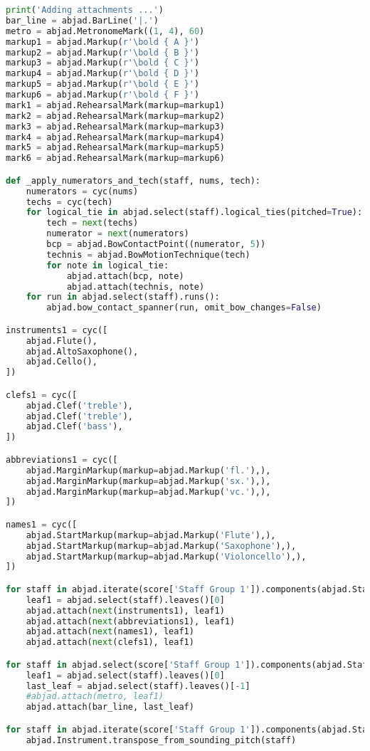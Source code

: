 \begin{lstlisting}[language=Python, caption=Four Ages of Sand Segment\_IV]
print('Adding attachments ...')
bar_line = abjad.BarLine('|.')
metro = abjad.MetronomeMark((1, 4), 60)
markup1 = abjad.Markup(r'\bold { A }')
markup2 = abjad.Markup(r'\bold { B }')
markup3 = abjad.Markup(r'\bold { C }')
markup4 = abjad.Markup(r'\bold { D }')
markup5 = abjad.Markup(r'\bold { E }')
markup6 = abjad.Markup(r'\bold { F }')
mark1 = abjad.RehearsalMark(markup=markup1)
mark2 = abjad.RehearsalMark(markup=markup2)
mark3 = abjad.RehearsalMark(markup=markup3)
mark4 = abjad.RehearsalMark(markup=markup4)
mark5 = abjad.RehearsalMark(markup=markup5)
mark6 = abjad.RehearsalMark(markup=markup6)

def _apply_numerators_and_tech(staff, nums, tech):
    numerators = cyc(nums)
    techs = cyc(tech)
    for logical_tie in abjad.select(staff).logical_ties(pitched=True):
        tech = next(techs)
        numerator = next(numerators)
        bcp = abjad.BowContactPoint((numerator, 5))
        technis = abjad.BowMotionTechnique(tech)
        for note in logical_tie:
            abjad.attach(bcp, note)
            abjad.attach(technis, note)
    for run in abjad.select(staff).runs():
        abjad.bow_contact_spanner(run, omit_bow_changes=False)

instruments1 = cyc([
    abjad.Flute(),
    abjad.AltoSaxophone(),
    abjad.Cello(),
])

clefs1 = cyc([
    abjad.Clef('treble'),
    abjad.Clef('treble'),
    abjad.Clef('bass'),
])

abbreviations1 = cyc([
    abjad.MarginMarkup(markup=abjad.Markup('fl.'),),
    abjad.MarginMarkup(markup=abjad.Markup('sx.'),),
    abjad.MarginMarkup(markup=abjad.Markup('vc.'),),
])

names1 = cyc([
    abjad.StartMarkup(markup=abjad.Markup('Flute'),),
    abjad.StartMarkup(markup=abjad.Markup('Saxophone'),),
    abjad.StartMarkup(markup=abjad.Markup('Violoncello'),),
])

for staff in abjad.iterate(score['Staff Group 1']).components(abjad.Staff):
    leaf1 = abjad.select(staff).leaves()[0]
    abjad.attach(next(instruments1), leaf1)
    abjad.attach(next(abbreviations1), leaf1)
    abjad.attach(next(names1), leaf1)
    abjad.attach(next(clefs1), leaf1)

for staff in abjad.select(score['Staff Group 1']).components(abjad.Staff)[0]:
    leaf1 = abjad.select(staff).leaves()[0]
    last_leaf = abjad.select(staff).leaves()[-1]
    #abjad.attach(metro, leaf1)
    abjad.attach(bar_line, last_leaf)

for staff in abjad.iterate(score['Staff Group 1']).components(abjad.Staff):
    abjad.Instrument.transpose_from_sounding_pitch(staff)


\end{lstlisting}
